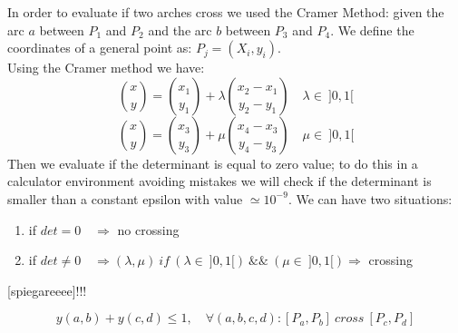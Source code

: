 In order to evaluate if two arches cross we used the Cramer Method: given the arc $a$ between $P_1$ and $P_2$ and the arc $b$ between $P_3$ and $P_4$. We define the coordinates of a general point as: $P_j = (X_i, y_i)$. \\
Using the Cramer method we have:
\[
{x \choose y} = {x_1 \choose y_1}+ \lambda {x_2 - x_1 \choose y_2 - y_1} \quad \lambda \in \ ]0, 1[
\]   
\[
{x \choose y} = {x_3 \choose y_3}+ \mu {x_4 - x_3 \choose y_4 - y_3} \quad \mu \in \ ]0, 1[
\]    
Then we evaluate if the determinant is equal to zero value; to do this in a calculator environment avoiding mistakes we will check if the determinant is smaller than a constant epsilon with value $\simeq 10^{-9}$. We can have two situations:
\begin{enumerate}
\item if $det=0 \quad \Rightarrow$ no crossing 
\item if $det \neq 0 \quad \Rightarrow (\lambda, \mu) \ if \ (\lambda \in \ ]0, 1[) \ \&\& \ (\mu \in \ ]0, 1[) \Rightarrow $ crossing
\end{enumerate}                                                   

[spiegareeee]!!!

\[
y(a,b)+ y(c,d) \leq 1, \quad \forall (a,b,c,d): [P_a, P_b] \ cross \ [P_c, P_d]
\]

